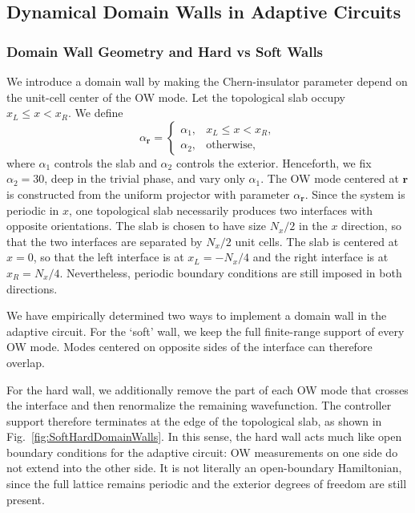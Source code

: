 \documentclass[aps,prb,twocolumn,superscriptaddress,longbibliography,floatfix]{revtex4-2}
\newcommand{\bfr}{\boldsymbol r}
\theoremstyle{plain}
\theoremstyle{definition}
\theoremstyle{remark}
\begin{document}
\subsection{Dynamical Domain Walls in Adaptive Circuits}
\subsubsection{Domain Wall Geometry and Hard vs Soft Walls}
We introduce a domain wall by making the Chern-insulator parameter depend on the unit-cell center of the OW mode. Let the topological slab occupy $x_L\leq x<x_R$. We define
\begin{equation}
    \alpha_{\bfr}=
    \begin{cases}
        \alpha_1, & x_L\leq x<x_R,\\
        \alpha_2, & \text{otherwise},
    \end{cases}
    \label{eq:UnitCellDependentAlpha}
\end{equation}
where $\alpha_1$ controls the slab and $\alpha_2$ controls the exterior. Henceforth, we fix $\alpha_2=30$, deep in the trivial phase, and vary only $\alpha_1$. The OW mode centered at $\bfr$ is constructed from the uniform projector with parameter $\alpha_{\bfr}$. Since the system is periodic in $x$, one topological slab necessarily produces two interfaces with opposite orientations. The slab is chosen to have size $N_x/2$ in the $x$ direction, so that the two interfaces are separated by $N_x/2$ unit cells. The slab is centered at $x=0$, so that the left interface is at $x_L=-N_x/4$ and the right interface is at $x_R=N_x/4$. Nevertheless, periodic boundary conditions are still imposed in both directions.

We have empirically determined two ways to implement a domain wall in the adaptive circuit. For the `soft' wall, we keep the full finite-range support of every OW mode. Modes centered on opposite sides of the interface can therefore overlap.

For the hard wall, we additionally remove the part of each OW mode that crosses the interface and then renormalize the remaining wavefunction. The controller support therefore terminates at the edge of the topological slab, as shown in Fig.~\ref{fig:SoftHardDomainWalls}. In this sense, the hard wall acts much like open boundary conditions for the adaptive circuit: OW measurements on one side do not extend into the other side. It is not literally an open-boundary Hamiltonian, since the full lattice remains periodic and the exterior degrees of freedom are still present.
\end{document}
